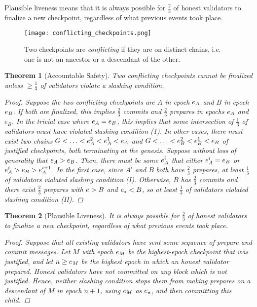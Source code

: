 \documentclass[12pt, final]{article}
\newtheorem{theorem}{Theorem}
\newcommand{\epoch}{\ensuremath{e}\space}
\newcommand{\epochsource}{\ensuremath{\epoch_{\star}}\space}
\newcommand{\Genesisblock}{\ensuremath{G}\space}
\begin{document}
Plausible liveness means that it is always possible for $\frac{2}{3}$ of honest validators to finalize a new checkpoint, regardless of what previous events took place.

\begin{figure}[h!tb]
\centering
    \texttt{[image: conflicting\_checkpoints.png]}
\caption{Two checkpoints are \textit{conflicting} if they are on distinct chains, i.e. one is not an ancestor or a descendant of the other.}
\label{fig:conflicting_checkpoints}
\end{figure}


\begin{theorem}[Accountable Safety]
\label{theorem:safety}
Two conflicting checkpoints cannot be finalized unless $\geq \frac{1}{3}$ of validators violate a slashing condition.

\begin{proof}
Suppose the two conflicting checkpoints are $A$ in epoch $\epoch_A$ and $B$ in epoch $\epoch_B$. If both are finalized, this implies $\frac{2}{3}$ commits and $\frac{2}{3}$ prepares in epochs $\epoch_A$ and $e_B$. In the trivial case where $\epoch_A = \epoch_B$, this implies that some intersection of $\frac{1}{3}$ of validators must have violated slashing condition (1). In other cases, there must exist two chains $\Genesisblock < \ldots < \epoch_A^2 < \epoch_A^1 < \epoch_A$ and $\Genesisblock < \ldots < \epoch_B^2 < \epoch_B^1 < \epoch_B$ of justified checkpoints, both terminating at the genesis. Suppose without loss of generality that $\epoch_A > \epoch_B$. Then, there must be some $\epoch_A^i$ that either $\epoch_A^i = \epoch_B$ or $\epoch_A^i > \epoch_B > \epoch_A^{i+1}$. In the first case, since $A^i$ and $B$ both have $\frac{2}{3}$ prepares, at least $\frac{1}{3}$ of validators violated slashing condition (I). Otherwise, $B$ has $\frac{2}{3}$ commits and there exist $\frac{2}{3}$ prepares with $\epoch > B$ and $\epochsource < B$, so at least $\frac{1}{3}$ of validators violated slashing condition (II).
\end{proof}
\end{theorem}

\begin{theorem}[Plausible Liveness]
\label{theorem:liveness}
It is always possible for $\frac{2}{3}$ of honest validators to finalize a new checkpoint, regardless of what previous events took place.

\begin{proof}
Suppose that all existing validators have sent some sequence of prepare and commit messages. Let $M$ with epoch $\epoch_M$ be the highest-epoch checkpoint that was justified, and let $n \ge \epoch_M$ be the highest epoch in which an honest validator prepared. Honest validators have not committed on any block which is not justified. Hence, neither slashing condition stops them from making prepares on a descendant of $M$ in epoch $n+1$, using $\epoch_M$ as $\epochsource$, and then committing this child.
\end{proof}

\end{theorem}
\end{document}
